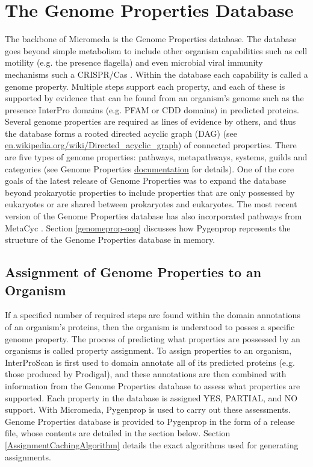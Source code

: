 \section{The Genome Properties Database} \label{genome-properties-overview}

The backbone of Micromeda is the Genome Properties \cite{Haft2013} database. The database goes beyond simple metabolism to include other organism capabilities such as cell motility (e.g. the presence flagella) and even microbial viral immunity mechanisms such a CRISPR/Cas \cite{horvath2010crispr}. Within the database each capability is called a genome property. Multiple steps support each property, and each of these is supported by evidence that can be found from an organism's genome such as the presence InterPro domains (e.g. PFAM or CDD domains) in predicted proteins. Several genome properties are required as lines of evidence by others, and thus the database forms a rooted directed acyclic graph (DAG) (see \href{en.wikipedia.org/wiki/Directed\_acyclic\_graph}{en.wikipedia.org/wiki/Directed\_acyclic\_graph}) of connected properties. There are five types of genome properties: pathways, metapathways, systems, guilds and categories (see Genome Properties \href{genome-properties.readthedocs.io/en/latest/flatfile.html\#desc-file}{documentation} for details). One of the core goals of the latest release of Genome Properties was to expand the database beyond prokaryotic properties to include properties that are only possessed by eukaryotes or are shared between prokaryotes and eukaryotes. The most recent version of the Genome Properties database has also incorporated pathways from MetaCyc \cite{karp2002metacyc}. Section \ref{genomeprop-oop} discusses how Pygenprop represents the structure of the Genome Properties database in memory.

\subsection{Assignment of Genome Properties to an Organism}

If a specified number of required steps are found within the domain annotations of an organism's proteins, then the organism is understood to posses a specific genome property. The process of predicting what properties are possessed by an organisms is called property assignment. To assign properties to an organism, InterProScan is first used to domain annotate all of its predicted proteins (e.g. those produced by Prodigal), and these annotations are then combined with information from the Genome Properties database to assess what properties are supported. Each property in the database is assigned YES, PARTIAL, and NO support. With Micromeda, Pygenprop is used to carry out these assessments. Genome Properties database is provided to Pygenprop in the form of a release file, whose contents are detailed in the section below. Section \ref{AssignmentCachingAlgorithm} details the exact algorithms used for generating assignments.  

